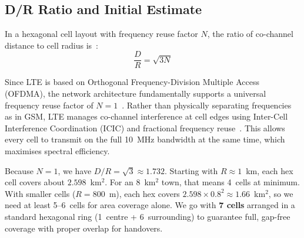 \documentclass[10pt,a4paper,twocolumn]{article}
\begin{document}
\subsection{D/R Ratio and Initial Estimate}

In a hexagonal cell layout with frequency reuse factor $N$, the ratio of co-channel distance to cell radius is~\cite{rappaport2024}:
\begin{equation}
\frac{D}{R} = \sqrt{3N}
\end{equation}

\begin{table}[H]
\centering
\caption{$D/R$ Ratios for Different Reuse Factors}
\label{tab:dr_ratios}
%
\end{table}

Since LTE is based on Orthogonal Frequency-Division Multiple Access (OFDMA), the network architecture fundamentally supports a universal frequency reuse factor of $N=1$~\cite{dahlman2011}. Rather than physically separating frequencies as in GSM, LTE manages co-channel interference at cell edges using Inter-Cell Interference Coordination (ICIC) and fractional frequency reuse~\cite{dahlman2011}. This allows every cell to transmit on the full 10~MHz bandwidth at the same time, which maximises spectral efficiency.

Because $N=1$, we have $D/R = \sqrt{3} \approx 1.732$. Starting with $R \approx 1$~km, each hex cell covers about $2.598$~km$^2$. For an 8~km$^2$ town, that means 4~cells at minimum. With smaller cells ($R = 800$~m), each hex covers $2.598 \times 0.8^2 \approx 1.66$~km$^2$, so we need at least 5--6~cells for area coverage alone. We go with \textbf{7 cells} arranged in a standard hexagonal ring (1~centre + 6~surrounding) to guarantee full, gap-free coverage with proper overlap for handovers.
\end{document}
